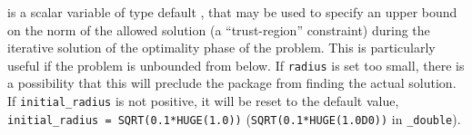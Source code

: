 \begin{description}



 is a scalar variable of type default 
\realdp, that may be used to specify an upper bound on the norm
of the allowed solution (a ``trust-region'' constraint) during the
iterative solution of the optimality phase of the problem.
This is particularly useful if the
problem is unbounded from below. If {\tt radius} is set too small, there
is a possibility that this will preclude the package from 
finding the actual solution.
If {\tt initial\_radius} is not positive, it will be reset to the 
default value, {\tt initial\_radius = SQRT(0.1*HUGE(1.0))}
({\tt SQRT(0.1*HUGE(1.0D0))} in {\tt \fullpackagename\_double}).



\end{description}
